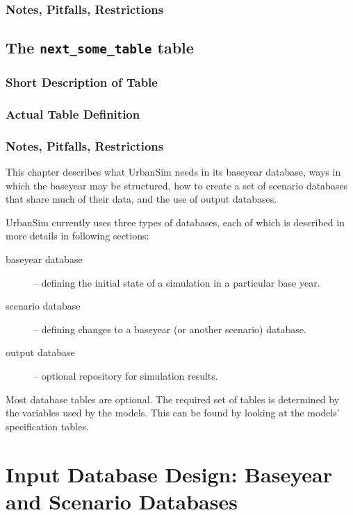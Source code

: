 \subsubsection{Notes, Pitfalls, Restrictions}
\subsection{The {\tt next_some_table} table}
\subsubsection{Short Description of Table}
\subsubsection{Actual Table Definition}
\subsubsection{Notes, Pitfalls, Restrictions}

This chapter describes what UrbanSim needs in its baseyear database, ways in
which the baseyear may be structured, how to create a set of scenario databases
that share much of their data, and the use of output databases.

UrbanSim currently uses three types of databases, each of which is described in
more details in following sections:

\begin{description}
\item[baseyear database] -- defining the initial state of a simulation in a
particular base year.
\item[scenario database] -- defining changes to a baseyear (or another scenario)
database.
\item[output database] -- optional repository for simulation results.
\end{description}

Most database tables are optional. The required set of tables is determined by
the variables used by the models.  This can be found by looking at the models'
specification tables.






\section{Input Database Design: Baseyear and Scenario Databases}
\label{urbansim-database-tables-baseyear-scenario-db}

